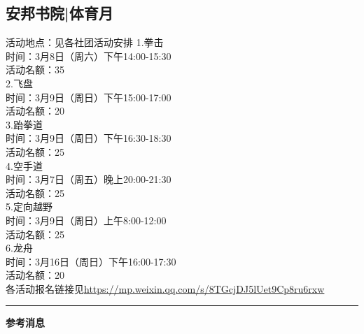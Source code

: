\documentclass[letterpaper, 12pt]{article}
\begin{document}
\begin{multicols}{2}
\section{安邦书院|体育月}
活动地点：见各社团活动安排
1.拳击\\
时间：3月8日（周六）下午14:00-15:30\\
活动名额：35\\
2.飞盘\\
时间：3月9日（周日）下午15:00-17:00\\
活动名额：20\\
3.跆拳道\\
时间：3月9日（周日）下午16:30-18:30\\
活动名额：25\\
4.空手道\\
时间：3月7日（周五）晚上20:00-21:30\\
活动名额：25\\
5.定向越野\\
时间：3月9日（周日）上午8:00-12:00\\
活动名额：25\\
6.龙舟\\
时间：3月16日（周日）下午16:00-17:30\\
活动名额：20\\
各活动报名链接见\url{https://mp.weixin.qq.com/s/8TGcjDJ5lUet9Cp8ru6rxw}

\end{multicols} 
\hrule
\vspace{4mm}
\centerline{\huge\textbf{参考消息}}
\end{document}

